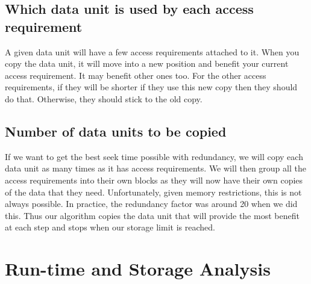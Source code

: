 \documentclass[conference]{acmsiggraph}
\begin{document}
\subsection{Which data unit is used by each access requirement}

A given data unit will have a few access requirements attached to it. When you copy the data unit, it will move into a new position and benefit your current access requirement. It may benefit other ones too. For the other access requirements, if they will be shorter if they use this new copy then they should do that. Otherwise, they should stick to the old copy. 

\subsection{Number of data units to be copied} 

If we want to get the best seek time possible with redundancy, we will copy each data unit as many times as it has access requirements. We will then group all the access requirements into their own blocks as they will now have their own copies of the data that they need. Unfortunately, given memory restrictions, this is not always possible. In practice, the redundancy factor was around 20 when we did this. Thus our algorithm copies the data unit that will provide the most benefit at each step and stops when our storage limit is reached. 

\section{Run-time and Storage Analysis}
\end{document}
